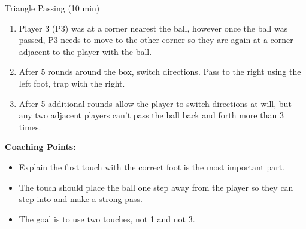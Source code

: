 \begin{evenBlock}{Triangle Passing (10 min)}
\begin{minipage}[t]{\linewidth}
\begin{minipage}{.6\linewidth}
\begin{enumerate}
            \item  Player 3 (P3) was at a corner nearest the ball, however once the ball was passed, P3 needs to move to the other corner so they are again at a corner adjacent to the player with the ball.
            \item After 5 rounds around the box, switch directions.  Pass to the right using the left foot, trap with the right.
            \item After 5 additional rounds allow the player to switch directions at will, but any two adjacent players can't pass the ball back and forth more than 3 times.
        \end{enumerate}
        
        \textbf{Coaching Points:}
        \begin{itemize}
            \setlength{\itemsep}{0pt}
            \setlength{\parskip}{0pt}
            \setlength{\parsep}{0pt}
            \item Explain the first touch with the correct foot is the most important part.
            \item The touch should place the ball one step away from the player so they can step into and make a strong pass.
            \item The goal is to use two touches, not 1 and not 3.
        \end{itemize}

    \end{minipage}
\end{minipage}

\end{evenBlock}